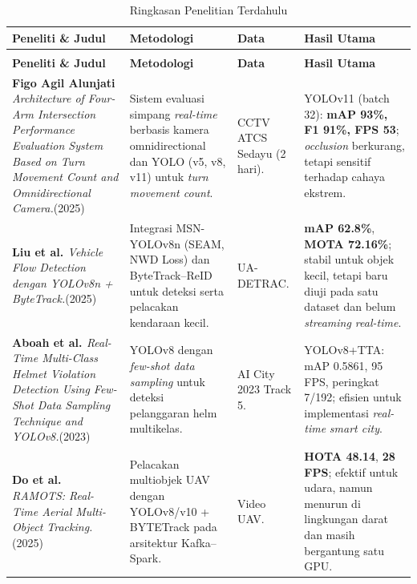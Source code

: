 {\footnotesize
  \setlength{\tabcolsep}{4pt}
  \begin{longtable}{@{}>{\RaggedRight\arraybackslash}p{} >{\RaggedRight\arraybackslash}p{} >{\RaggedRight\arraybackslash}p{} >{\RaggedRight\arraybackslash}p{}@{}}
    \caption{Ringkasan Penelitian Terdahulu}
    \label{tab:penelitian_terdahulu} \\
    \toprule
    \textbf{Peneliti \& Judul} & \textbf{Metodologi} & \textbf{Data} & \textbf{Hasil Utama} \\
    \midrule
    \endfirsthead

    \caption[]{Ringkasan Penelitian Terdahulu} \\
    \toprule
    \textbf{Peneliti \& Judul} & \textbf{Metodologi} & \textbf{Data} & \textbf{Hasil Utama} \\
    \midrule
    \endhead

    \midrule
    \endfoot

    \bottomrule
    \endlastfoot

    \textbf{Figo Agil Alunjati \cite{alunjati2025intersection}} \newline
    \textit{Architecture of Four-Arm Intersection Performance Evaluation System Based on Turn Movement Count and Omnidirectional Camera.}(2025) &
    Sistem evaluasi simpang \textit{real-time} berbasis kamera omnidirectional dan YOLO (v5, v8, v11) untuk \textit{turn movement count}. &
    CCTV ATCS Sedayu (2 hari). &
    YOLOv11 (batch 32): \textbf{mAP 93\%, F1 91\%, FPS 53}; \textit{occlusion} berkurang, tetapi sensitif terhadap cahaya ekstrem. \\

    \textbf{Liu et al. \cite{liu2025vehicle}} \newline
    \textit{Vehicle Flow Detection dengan YOLOv8n + ByteTrack.}(2025) &
    Integrasi MSN-YOLOv8n (SEAM, NWD Loss) dan ByteTrack--ReID untuk deteksi serta pelacakan kendaraan kecil. &
    UA-DETRAC. &
    \textbf{mAP 62.8\%}, \textbf{MOTA 72.16\%}; stabil untuk objek kecil, tetapi baru diuji pada satu dataset dan belum \textit{streaming real-time}. \\

    \textbf{Aboah et al. \cite{aboah2023helmet}} \newline
    \textit{Real-Time Multi-Class Helmet Violation Detection Using Few-Shot Data Sampling Technique and YOLOv8.}(2023) &
    YOLOv8 dengan \textit{few-shot data sampling} untuk deteksi pelanggaran helm multikelas. &
    AI City 2023 Track 5. &
    YOLOv8+TTA: mAP 0.5861, 95 FPS, peringkat 7/192; efisien untuk implementasi \textit{real-time} \textit{smart city}. \\

    \textbf{Do et al. \cite{do2025ramots}} \newline
    \textit{RAMOTS: Real-Time Aerial Multi-Object Tracking.}(2025) &
    Pelacakan multiobjek UAV dengan YOLOv8/v10 + BYTETrack pada arsitektur Kafka--Spark. &
    Video UAV. &
    \textbf{HOTA 48.14}, \textbf{28 FPS}; efektif untuk udara, namun menurun di lingkungan darat dan masih bergantung satu GPU. \\

\end{longtable}}

